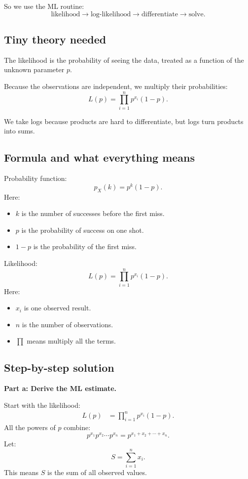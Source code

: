 \documentclass[11pt,a4paper]{article}
\begin{document}
So we use the ML routine:
\[
\text{likelihood} \rightarrow \text{log-likelihood} \rightarrow \text{differentiate} \rightarrow \text{solve}.
\]

\subsection*{Tiny theory needed}
The likelihood is the probability of seeing the data, treated as a function of the unknown parameter \(p\).

Because the observations are independent, we multiply their probabilities:
\[
L(p)=\prod_{i=1}^n p^{x_i}(1-p).
\]

We take logs because products are hard to differentiate, but logs turn products into sums.

\subsection*{Formula and what everything means}
Probability function:
\[
p_X(k)=p^k(1-p).
\]
Here:
\begin{itemize}[leftmargin=*]
    \item \(k\) is the number of successes before the first miss.
    \item \(p\) is the probability of success on one shot.
    \item \(1-p\) is the probability of the first miss.
\end{itemize}

Likelihood:
\[
L(p)=\prod_{i=1}^n p^{x_i}(1-p).
\]
Here:
\begin{itemize}[leftmargin=*]
    \item \(x_i\) is one observed result.
    \item \(n\) is the number of observations.
    \item \(\prod\) means multiply all the terms.
\end{itemize}

\subsection*{Step-by-step solution}
\textbf{Part a: Derive the ML estimate.}

Start with the likelihood:
\begin{align*}
L(p)
&=\prod_{i=1}^n p^{x_i}(1-p).
\end{align*}
All the powers of \(p\) combine:
\[
p^{x_1}p^{x_2}\cdots p^{x_n}=p^{x_1+x_2+\cdots+x_n}.
\]
Let:
\[
S=\sum_{i=1}^n x_i.
\]
This means \(S\) is the sum of all observed values.
\end{document}
